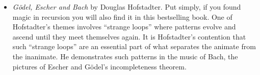 \begin{itemize}
\item {\em G\"{o}del, Escher and Bach} by Douglas Hofstadter.  Put simply,
if you found magic in recursion you will also find it in this
bestselling book.  One of Hofstadter's themes involves ``strange loops''
where patterns evolve and ascend until they meet themselves again.  It
is Hofstadter's contention that such ``strange loops'' are an essential
part of what separates the animate from the inanimate.  He
demonstrates such patterns in the music of Bach, the pictures of
Escher and G\"{o}del's incompleteness theorem.

\end{itemize}
